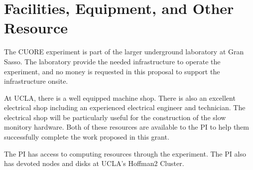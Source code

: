 \section{Facilities, Equipment, and Other Resource}
The CUORE experiment is part of the larger underground laboratory at Gran Sasso. The laboratory provide the needed infrastructure to operate the experiment, and no money is requested in this proposal to support the infrastructure onsite.

At UCLA, there is a well equipped machine shop. There is also an excellent electrical shop including an experienced electrical engineer and technician. The electrical shop will be particularly useful for the construction of the slow monitory hardware. Both of these resources are available to the PI to help them successfully complete the work proposed in this grant. 

The PI has access to computing resources through the experiment. The PI also has devoted nodes and disks at UCLA's Hoffman2 Cluster.